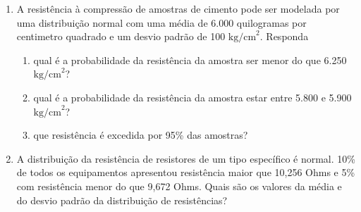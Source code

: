 \begin{exercise}
\begin{multicols}{2}
\begin{enumerate}[label=\textbf{\color{ocre}\arabic*.}, itemsep=20pt]
		\item A resistência à compressão de amostras de cimento pode ser modelada por uma distribuição normal com uma média de 6.000 quilogramas por centimetro quadrado e um desvio padrão de 100 $\text{kg/cm}^2$. Responda
			\begin{enumerate}[label=\textbf{\color{ocre}(\alph*)}]
				\item qual é a probabilidade da resistência da amostra ser menor do que 6.250 $\text{kg/cm}^2$?
				\item qual é a probabilidade da resistência da amostra estar entre 5.800 e 5.900 $\text{kg/cm}^2$?
				\item que resistência é excedida por 95\% das amostras?
			\end{enumerate}
		
		\item A distribuição da resistência de resistores de um tipo específico é normal. 10\% de todos os equipamentos apresentou resistência maior que 10,256 Ohms e 5\% com resistência menor do que 9,672 Ohms. Quais são os valores da média e do desvio padrão da distribuição de resistências?
	\end{enumerate}
	\end{multicols}
\end{exercise}
\newpage\opensidepicturearea

